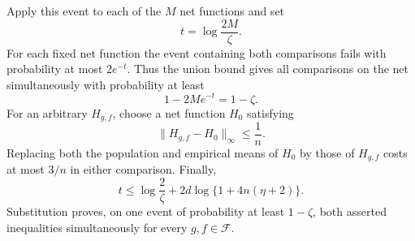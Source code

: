 Apply this event to each of the \(M\) net functions and set
\[
t=\log\frac{2M}{\zeta}.
\]
For each fixed net function the event containing both comparisons fails with probability at most \(2e^{-t}\). Thus the union bound gives all comparisons on the net simultaneously with probability at least
\[
1-2Me^{-t}=1-\zeta.
\]
For an arbitrary \(H_{g,f}\), choose a net function \(H_0\) satisfying
\[
\|H_{g,f}-H_0\|_\infty\le\frac1n.
\]
Replacing both the population and empirical means of \(H_0\) by those of \(H_{g,f}\) costs at most \(3/n\) in either comparison. Finally,
\[
t
\le\log\frac2\zeta
+2d\log\{1+4n(\eta+2)\}.
\]
Substitution proves, on one event of probability at least \(1-\zeta\), both asserted inequalities simultaneously for every \(g,f\in\mathcal F\).